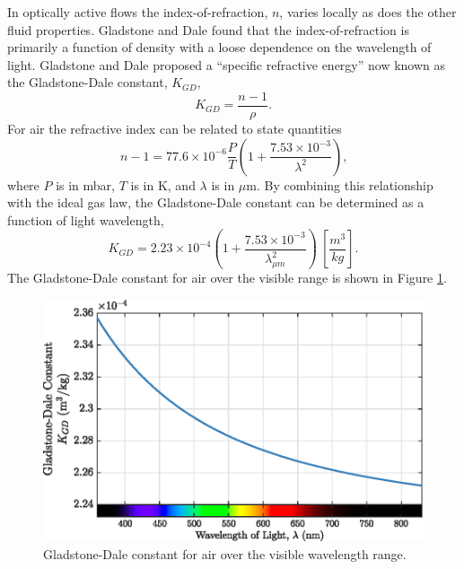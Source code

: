 In optically active flows the index-of-refraction, $n$, varies locally as does the other fluid properties.
Gladstone and Dale \cite{Gladstone-1863-ND4wtDT9} found that the index-of-refraction is primarily a function of density with a loose dependence on the wavelength of light.
Gladstone and Dale proposed a ``specific refractive energy'' now known as the Gladstone-Dale constant, $K_{GD}$,
\begin{equation}
  K_{GD} = \frac{n-1}{\rho}\textrm{.}
  \label{eqn:02_gladstone_dale_constant}
\end{equation}
For air the refractive index can be related to state quantities \cite{Valley-1965-F3k3cmv6}
\begin{equation}
  n-1 = 77.6\times 10^{-6}\frac{P}{T}\left(1+\frac{7.53\times10^{-3}}{\lambda^2}\right)\textrm{,}
  \label{eqn:02_refractive_index_ptlambda}
\end{equation}
where $P$ is in mbar, $T$ is in K, and $\lambda$ is in $\mu$m.
By combining this relationship with the ideal gas law, the Gladstone-Dale constant can be determined as a function of light wavelength,
\begin{equation}
  K_{GD} = 2.23\times10^{-4}\left(1+\frac{7.53\times10^{-3}}{\lambda_{\mu m}^2}\right) \: \left[\frac{m^3}{kg}\right]\textrm{.}
  \label{eqn:02_gladstone_dale_wavelength}
\end{equation}
The Gladstone-Dale constant for air over the visible range is shown in Figure \ref{fig:02_gladstone_dale_wavelength}.
\begin{figure}
  \centering
  \includegraphics{../matlab/02_background/gladstone_dale_wavelength.eps}
  \caption{Gladstone-Dale constant for air over the visible wavelength range.}
  \label{fig:02_gladstone_dale_wavelength}
\end{figure}

